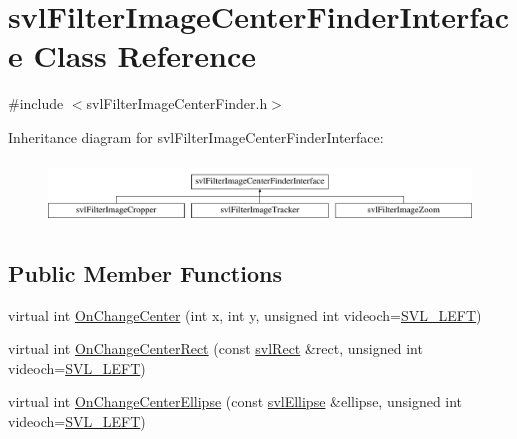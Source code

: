 \hypertarget{classsvl_filter_image_center_finder_interface}{\section{svl\-Filter\-Image\-Center\-Finder\-Interface Class Reference}
\label{classsvl_filter_image_center_finder_interface}
}


{\ttfamily \#include $<$svl\-Filter\-Image\-Center\-Finder.\-h$>$}

Inheritance diagram for svl\-Filter\-Image\-Center\-Finder\-Interface\-:\begin{figure}[H]
\begin{center}
\leavevmode
\includegraphics[height=1.674140cm]{da/d50/classsvl_filter_image_center_finder_interface}
\end{center}
\end{figure}
\subsection*{Public Member Functions}
\begin{DoxyCompactItemize}
\item 
virtual int \hyperlink{classsvl_filter_image_center_finder_interface_a1033c4b107100b8cb6565922442db2f1}{On\-Change\-Center} (int x, int y, unsigned int videoch=\hyperlink{svl_definitions_8h_ab9fec7615f19c8df2919eebcab0b187f}{S\-V\-L\-\_\-\-L\-E\-F\-T})
\item 
virtual int \hyperlink{classsvl_filter_image_center_finder_interface_a8c8d6d68ad9180bd9480c2575b668b5c}{On\-Change\-Center\-Rect} (const \hyperlink{structsvl_rect}{svl\-Rect} \&rect, unsigned int videoch=\hyperlink{svl_definitions_8h_ab9fec7615f19c8df2919eebcab0b187f}{S\-V\-L\-\_\-\-L\-E\-F\-T})
\item 
virtual int \hyperlink{classsvl_filter_image_center_finder_interface_aab0f7f23286f56bee292581c40e28c6d}{On\-Change\-Center\-Ellipse} (const \hyperlink{structsvl_ellipse}{svl\-Ellipse} \&ellipse, unsigned int videoch=\hyperlink{svl_definitions_8h_ab9fec7615f19c8df2919eebcab0b187f}{S\-V\-L\-\_\-\-L\-E\-F\-T})
\end{DoxyCompactItemize}


